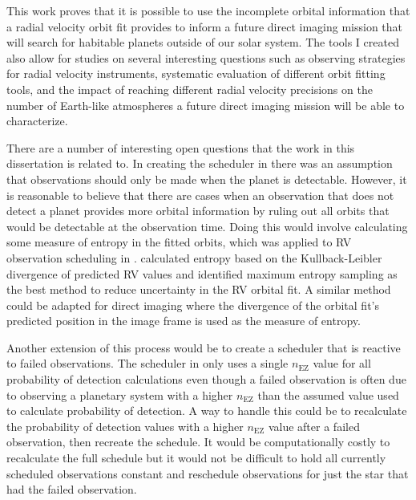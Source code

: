 This work proves that it is possible to use the incomplete orbital information
that a radial velocity orbit fit provides to inform a future direct imaging
mission that will search for habitable planets outside of our solar system. The
tools I created also allow for studies on several interesting questions
such as observing strategies for radial velocity instruments, systematic
evaluation of different orbit fitting tools, and the impact of reaching
different radial velocity precisions on the number of Earth-like atmospheres a
future direct imaging mission will be able to characterize.

There are a number of interesting open questions that the work in this
dissertation is related to. In creating the scheduler in
 there was an assumption that observations should
only be made when the planet is detectable. However, it is reasonable to
believe that there are cases when an observation that does not detect a planet
provides more orbital information by ruling out all orbits that would be
detectable at the observation time. Doing this would involve calculating some
measure of entropy in the fitted orbits, which was applied to RV observation
scheduling in \citet{loredoBayesianMethodsAnalysis2012}.
\citet{loredoBayesianMethodsAnalysis2012} calculated entropy based on the
Kullback-Leibler divergence of predicted RV values and identified maximum
entropy sampling as the best method to reduce uncertainty in the RV orbital
fit. A similar method could be adapted for direct imaging where the divergence
of the orbital fit's predicted position in the image frame is used as the
measure of entropy.

Another extension of this process would be to create a scheduler that is
reactive to failed observations. The scheduler in 
only uses a single $n_\textrm{EZ}$ value for all probability of detection
calculations even though a failed observation is often due to observing a
planetary system with a higher $n_\textrm{EZ}$ than the assumed value used to
calculate probability of detection. A way to handle this could be to
recalculate the probability of detection values with a higher $n_\textrm{EZ}$
value after a failed observation, then recreate the schedule. It would be
computationally costly to recalculate the full schedule but it would not be
difficult to hold all currently scheduled observations constant and reschedule
observations for just the star that had the failed observation.

